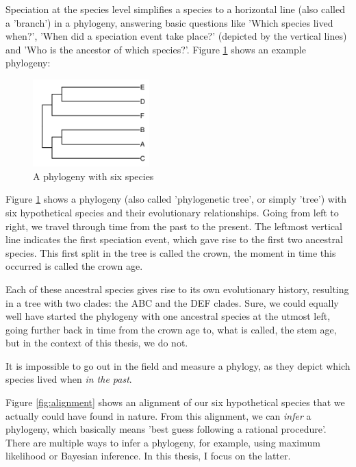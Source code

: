 Speciation at the species level simplifies a species to a horizontal 
line (also called a 'branch') in a phylogeny, answering
basic questions like 'Which species lived when?', 'When did a speciation 
event take place?' (depicted by the vertical lines)
and 'Who is the ancestor of which species?'. 
Figure \ref{fig:phylogeny} shows an example phylogeny:

\begin{figure}[H]
  \includegraphics[width=0.4\textwidth]{phylogeny.png}
  \caption{
    A phylogeny with six species
  }
  \label{fig:phylogeny}
\end{figure}

Figure \ref{fig:phylogeny} shows a phylogeny (also called 'phylogenetic tree', 
or simply 'tree') with six hypothetical species and their evolutionary 
relationships. Going from left to right, we travel through time from 
the past to the present. 
The leftmost vertical line indicates the first speciation event, 
which gave rise to the first two ancestral species. 
This first split in the tree is called the crown,
the moment in time this occurred is called the crown age.

Each of these ancestral species gives rise to its own evolutionary history,
resulting in a tree with two clades: the ABC and the DEF clades.
Sure, we could equally well have started the phylogeny 
with one ancestral species at the utmost left,
going further back in time from the crown age to, what is called, the stem age,
but in the context of this thesis, we do not.

It is impossible to go out in the field and measure a phylogy, 
as they depict which species lived when \emph{in the past}. 

Figure \ref{fig:alignment} shows an alignment of our six hypothetical species
that we actually could have found in nature. From this alignment, we
can \emph{infer} a phylogeny, which basically means 'best guess following a 
rational procedure'. There are multiple ways to infer a phylogeny, for
example, using maximum likelihood or Bayesian inference. In this thesis, 
I focus on the latter.

